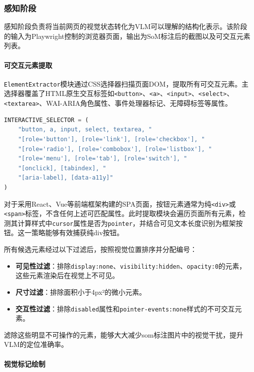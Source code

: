 \documentclass{SYSUReport}
\begin{document}
\subsubsection{感知阶段}

感知阶段负责将当前网页的视觉状态转化为VLM可以理解的结构化表示。该阶段的输入为Playwright控制的浏览器页面\cite{playwright}，输出为SoM标注后的截图\cite{rvlm}以及可交互元素列表。

\paragraph{可交互元素提取}

\texttt{ElementExtractor}模块通过CSS选择器扫描页面DOM，提取所有可交互元素。主选择器覆盖了HTML原生交互标签如\texttt{<button>}、\texttt{<a>}、\texttt{<input>}、\texttt{<select>}、\texttt{<textarea>}、WAI-ARIA角色属性、事件处理器标记、无障碍标签等属性\cite{webvoyager}。

\begin{lstlisting}[language=Python, caption=INTERACTIVE\_SELECTOR定义, label=lst:selector]
INTERACTIVE_SELECTOR = (
    "button, a, input, select, textarea, "
    "[role='button'], [role='link'], [role='checkbox'], "
    "[role='radio'], [role='combobox'], [role='listbox'], "
    "[role='menu'], [role='tab'], [role='switch'], "
    "[onclick], [tabindex], "
    "[aria-label], [data-a11y]"
)
\end{lstlisting}

对于采用React、Vue等前端框架构建的SPA页面，按钮元素通常为纯\texttt{<div>}或\texttt{<span>}标签，不含任何上述可匹配属性。此时提取模块会遍历页面所有元素，检测其计算样式中\texttt{cursor}属性是否为\texttt{pointer}，并结合可见文本长度识别为框架按钮。这一策略能够有效捕获纯div按钮。

所有候选元素经过以下过滤后，按照视觉位置排序并分配编号：
\begin{itemize}
    \item \textbf{可见性过滤}：排除\texttt{display:none}、\texttt{visibility:hidden}、\texttt{opacity:0}的元素，这些元素渲染后在视觉上不可见。
    \item \textbf{尺寸过滤}：排除面积小于4px²的微小元素。
    \item \textbf{交互性过滤}：排除\texttt{disabled}属性和\texttt{pointer-events:none}样式的不可交互元素。
\end{itemize}

滤除这些明显不可操作的元素，能够大大减少som标注图片中的视觉干扰，提升VLM的定位准确率。

\paragraph{视觉标记绘制}
\end{document}
